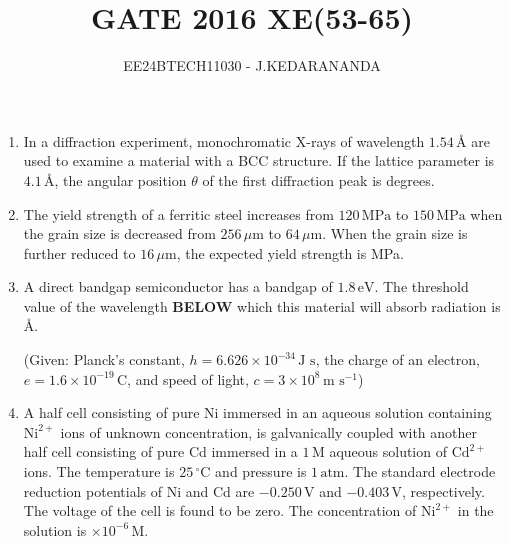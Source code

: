 \documentclass[journal]{IEEEtran}
\renewcommand{\thefigure}{\theenumi}
\renewcommand{\thetable}{\theenumi}
\numberwithin{equation}{enumi}
\numberwithin{figure}{enumi}
\renewcommand{\thetable}{\theenumi}
\begin{document}

\vspace{3cm}

\title{GATE 2016 XE(53-65)}
\author{EE24BTECH11030 - J.KEDARANANDA}
{\let\newpage\relax\maketitle}
\renewcommand{\thefigure}{\theenumi}
\renewcommand{\thetable}{\theenumi}
\begin{enumerate}
    \item In a diffraction experiment, monochromatic X-rays of wavelength $1.54 \, \text{\AA}$ are used to examine a material with a BCC structure. If the lattice parameter is $4.1 \, \text{\AA}$, the angular position $\theta$ of the first diffraction peak is \underline{\hspace{1cm}} degrees.
    
    \bigskip
    
    \item The yield strength of a ferritic steel increases from $120 \, \text{MPa}$ to $150 \, \text{MPa}$ when the grain size is decreased from $256 \, \mu\text{m}$ to $64 \, \mu\text{m}$. When the grain size is further reduced to $16 \, \mu\text{m}$, the expected yield strength is \underline{\hspace{1cm}} MPa.
    
    \bigskip

    \item A direct bandgap semiconductor has a bandgap of $1.8 \, \text{eV}$. The threshold value of the wavelength {\textbf{BELOW}} which this material will absorb radiation is \underline{\hspace{1cm}} $\text{\AA}$.
    
    (Given: Planck's constant, $h = 6.626 \times 10^{-34} \, \text{J s}$, the charge of an electron, $e = 1.6 \times 10^{-19} \, \text{C}$, and speed of light, $c = 3 \times 10^8 \, \text{m s}^{-1}$)
    
    \bigskip

    \item A half cell consisting of pure Ni immersed in an aqueous solution containing $\text{Ni}^{2+}$ ions of unknown concentration, is galvanically coupled with another half cell consisting of pure Cd immersed in a $1 \, \text{M}$ aqueous solution of $\text{Cd}^{2+}$ ions. The temperature is $25 \, ^\circ \text{C}$ and pressure is $1 \, \text{atm}$. The standard electrode reduction potentials of Ni and Cd are $-0.250 \, \text{V}$ and $-0.403 \, \text{V}$, respectively. The voltage of the cell is found to be zero. The concentration of $\text{Ni}^{2+}$ in the solution is \underline{\hspace{1cm}} $\times 10^{-6} \, \text{M}$.
    

\end{enumerate}
\end{document}
